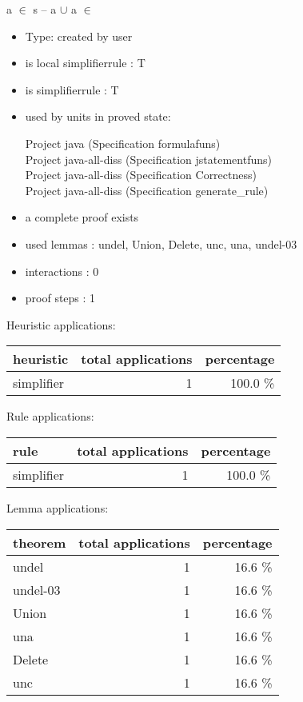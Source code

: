 \documentclass[a4paper]{article}
\begin{document}
\medskip

 \Fol a $\in$ s -- a $\cup$  \Equiv a $\in$ 

\begin{itemize}

\item Type: created by user

\item is local simplifierrule : T
\item is simplifierrule : T
\item used by units in proved state:

Project java (Specification formulafuns) \\
Project java-all-diss (Specification jstatementfuns) \\
Project java-all-diss (Specification Correctness) \\
Project java-all-diss (Specification generate\_rule)
\item       a complete proof exists
\item       used lemmas  : undel, Union, Delete, unc, una, undel-03
\item       interactions : 0
\item       proof steps  : 1
\end{itemize}

\medskip


Heuristic applications:

\begin{supertabular}{l|r|r}
heuristic	& total applications & percentage \\ \hline
simplifier & 1 & 100.0 \% \\

\end{supertabular}

Rule applications:

\begin{supertabular}{l|r|r}
rule	        & total applications & percentage \\ \hline
simplifier & 1 & 100.0 \% \\

\end{supertabular}

Lemma applications:

\begin{supertabular}{l|r|r}
theorem	        & total applications & percentage \\ \hline
undel & 1 & 16.6 \% \\
undel-03 & 1 & 16.6 \% \\
Union & 1 & 16.6 \% \\
una & 1 & 16.6 \% \\
Delete & 1 & 16.6 \% \\
unc & 1 & 16.6 \% \\

\end{supertabular}
\pagebreak
\end{document}
